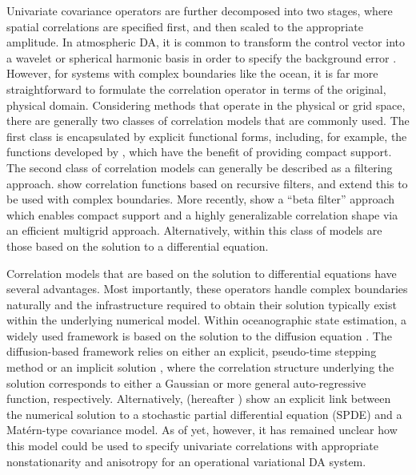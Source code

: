 Univariate covariance operators are further decomposed into two stages, where spatial
correlations are specified first, and then scaled to the appropriate amplitude.
In atmospheric DA, it is common to transform the control vector
into a wavelet or spherical harmonic basis in order to specify the background
error \citep[e.g.,][]{bannister_review_2008-2}.
However, for systems with complex boundaries like the ocean, it is far more
straightforward to formulate the correlation operator in terms of the original,
physical domain.
Considering methods that operate in the physical or grid space, there are
generally two classes of correlation models that are commonly used.
The first class is encapsulated by explicit functional forms, including, for
example, the functions developed by
\citet{gaspari_construction_1999,gneiting_correlation_1999,gaspari_construction_2006},
which have the benefit of providing compact support.
The second class of correlation models can generally be described as a filtering
approach.
\citet{purser_numerical_2003-2,purser_numerical_2003-1}
show correlation functions based on recursive filters, and
\citet{dobricic_oceanographic_2008} extend this to be used with complex boundaries.
More recently, \citet{purser_multigrid_2022} show a ``beta
filter'' approach which enables compact support and a highly generalizable
correlation shape via an efficient multigrid approach.
Alternatively, within this class of models are those based on the solution to a
differential equation.

Correlation models that are based on the solution to differential equations have
several advantages.
Most importantly, these operators handle complex boundaries naturally and the
infrastructure required to obtain their solution typically exist within
the underlying numerical model.
Within oceanographic state estimation, a widely used framework is based on the
solution to the diffusion equation
\citep[e.g.,][]{nguyen_arctic_2021,forgetECCOv4,blockley_recent_2014,moore_regional_2011-1,daget_ensemble_2009,muccino_inverse_2008,di_lorenzo_weak_2007,weaver_three-_2003}.
The diffusion-based framework relies on either an explicit, pseudo-time stepping
method \citep{weaver_correlation_2001} or an implicit solution
\citep{mirouze_representation_2010,carrier_background-error_2010,weaver_diffusion_2013},
where the correlation structure underlying the solution corresponds to either a
Gaussian or more general auto-regressive function, respectively.
Alternatively, \citet{RSSB:RSSB777} (hereafter )
show an explicit link between the numerical solution
to a stochastic partial differential equation (SPDE) and a Mat\'ern-type covariance
model.
As of yet, however, it has remained unclear how this model could be used to
specify univariate correlations with appropriate nonstationarity and anisotropy
for an operational variational DA system.

